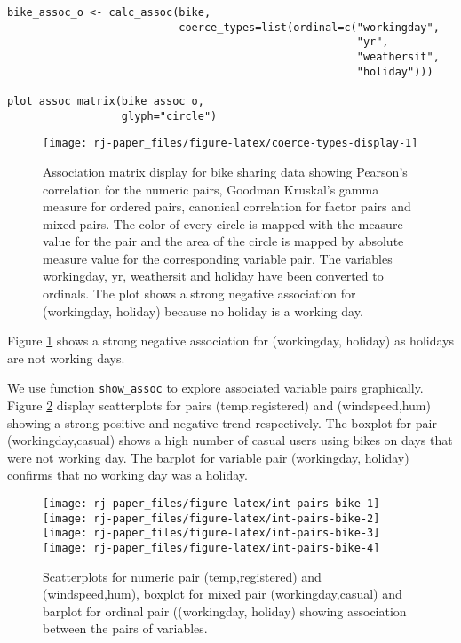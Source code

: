 \begin{verbatim}
bike_assoc_o <- calc_assoc(bike, 
                           coerce_types=list(ordinal=c("workingday", 
                                                       "yr", 
                                                       "weathersit", 
                                                       "holiday")))

plot_assoc_matrix(bike_assoc_o,
                  glyph="circle")
\end{verbatim}

\begin{figure}

{\centering \texttt{[image: rj-paper\_files/figure-latex/coerce-types-display-1]} 

}

\caption{Association matrix display for bike sharing data showing Pearson's correlation for the numeric pairs, Goodman Kruskal's gamma measure for ordered pairs, canonical correlation for factor pairs and mixed pairs. The color of every circle is mapped with the measure value for the pair and the area of the circle is mapped by absolute measure value for the corresponding variable pair. The variables workingday, yr, weathersit and holiday have been converted to ordinals. The plot shows a strong negative association for (workingday, holiday) because no holiday is a working day.}\label{fig:coerce-types-display}
\end{figure}

Figure \ref{fig:coerce-types-display} shows a strong negative association for (workingday, holiday) as holidays are not working days.

We use function \texttt{show\_assoc} to explore associated variable pairs graphically. Figure \ref{fig:int-pairs-bike} display scatterplots for pairs (temp,registered) and (windspeed,hum) showing a strong positive and negative trend respectively. The boxplot for pair (workingday,casual) shows a high number of casual users using bikes on days that were not working day. The barplot for variable pair (workingday, holiday) confirms that no working day was a holiday.

\begin{figure}
\texttt{[image: rj-paper\_files/figure-latex/int-pairs-bike-1]} \texttt{[image: rj-paper\_files/figure-latex/int-pairs-bike-2]} \texttt{[image: rj-paper\_files/figure-latex/int-pairs-bike-3]} \texttt{[image: rj-paper\_files/figure-latex/int-pairs-bike-4]} \caption{Scatterplots for numeric pair (temp,registered) and (windspeed,hum),  boxplot for mixed pair (workingday,casual) and barplot for ordinal pair ((workingday, holiday) showing association between the pairs of variables.}\label{fig:int-pairs-bike}
\end{figure}

